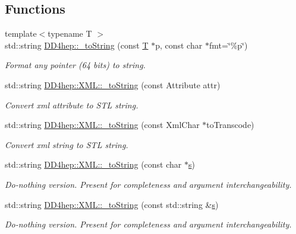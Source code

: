 \subsection*{Functions}
\begin{DoxyCompactItemize}
\item 
{\footnotesize template$<$typename T $>$ }\\std::string \hyperlink{group___d_d4_h_e_p___x_m_l_ga4ca22c7dce6a70d4f7908b3f1340624c}{DD4hep::\_\-toString} (const \hyperlink{class_t}{T} $\ast$p, const char $\ast$fmt=\char`\"{}\%p\char`\"{})
\begin{DoxyCompactList}\small\item\em Format any pointer (64 bits) to string. \item\end{DoxyCompactList}\item 
std::string \hyperlink{group___d_d4_h_e_p___x_m_l_gad2124529d3b80b7896b4d5a370ee906e}{DD4hep::XML::\_\-toString} (const Attribute attr)
\begin{DoxyCompactList}\small\item\em Convert xml attribute to STL string. \item\end{DoxyCompactList}\item 
std::string \hyperlink{group___d_d4_h_e_p___x_m_l_ga4c56544a190950d18779b16e986783ab}{DD4hep::XML::\_\-toString} (const XmlChar $\ast$toTranscode)
\begin{DoxyCompactList}\small\item\em Convert xml string to STL string. \item\end{DoxyCompactList}\item 
std::string \hyperlink{group___d_d4_h_e_p___x_m_l_ga7a1c3ef4f1a036d3ccccfd9fff8cd30f}{DD4hep::XML::\_\-toString} (const char $\ast$\hyperlink{_volumes_8cpp_a17ca6bfc8040d695d3cada22a4763d40}{s})
\begin{DoxyCompactList}\small\item\em Do-\/nothing version. Present for completeness and argument interchangeability. \item\end{DoxyCompactList}\item 
std::string \hyperlink{group___d_d4_h_e_p___x_m_l_ga11593305fa28cb3f91fd4cb08e0aa670}{DD4hep::XML::\_\-toString} (const std::string \&\hyperlink{_volumes_8cpp_a17ca6bfc8040d695d3cada22a4763d40}{s})
\begin{DoxyCompactList}\small\item\em Do-\/nothing version. Present for completeness and argument interchangeability. \item\end{DoxyCompactList}\item 

\end{DoxyCompactItemize}
